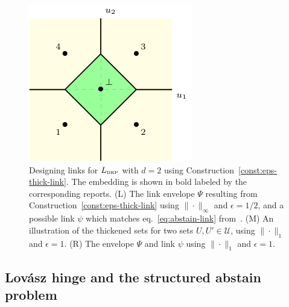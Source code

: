 \documentclass[11pt]{article}
\newcommand{\BEP}{L_{\text{\tiny BEP}}}
\newcommand{\U}{\mathcal{U}}
\begin{document}
\begin{figure}
\begin{center}
\begin{minipage}{0.32\linewidth}
\end{minipage}\hfill
\begin{minipage}{0.32\linewidth}
\includegraphics[width=\linewidth]{tikz/abstain-link-l1.pdf}
\end{minipage}\hfill
\caption{Designing links for $\BEP$ with $d=2$ using Construction~\ref{const:eps-thick-link}. The embedding is shown in bold labeled by the corresponding reports. (L) The link envelope $\Psi$ resulting from Construction~\ref{const:eps-thick-link} using $\|\cdot\|_\infty$ and $\epsilon = 1/2$, and a possible link $\psi$ which matches eq.~\eqref{eq:abstain-link} from~\cite{ramaswamy2018consistent}.  (M) An illustration of the thickened sets for two sets $U, U' \in \U$, using $\|\cdot\|_1$ and $\epsilon = 1$. (R) The envelope $\Psi$ and link $\psi$ %
  using $\|\cdot\|_1$ and $\epsilon = 1$.}
\label{fig:abstain-links}
\end{center}
\end{figure}


\subsection{Lov\'asz hinge and the structured abstain problem}
\label{sec:lovasz-hinge}

\newcommand{\dis}{\mathrm{dis}}
\newcommand{\abs}{\mathrm{abs}}
\end{document}
